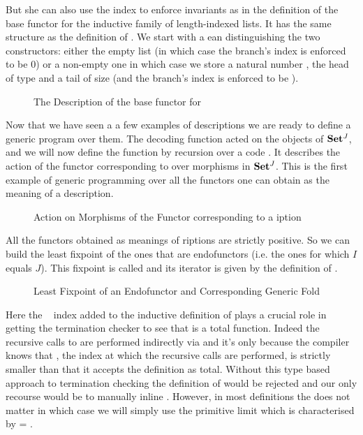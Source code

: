 But she can also use the index to enforce invariants as in the definition
of the base functor for the    inductive family of
length-indexed lists. It has the same structure as the definition of .
We start with a ean distinguishing the two constructors: either
the empty list (in which case the branch's index is enforced to be $0$) or a
non-empty one in which case we store a natural number , the head of type
 and a tail of size  (and the branch's index is enforced to be
 ).

\begin{figure}[h]
\caption{The Description of the base functor for   }\label{figure:vecD}
\end{figure}

Now that we have seen a a few examples of descriptions we are ready to define
a generic program over them. The decoding function  acted on the objects
of $\mathbf{Set}{}^J$, and we will now define the function  by recursion over a
code . It describes the action of the functor corresponding to  over
morphisms in $\mathbf{Set}{}^J$. This is the first example of generic programming over all
the functors one can obtain as the meaning of a description.

\begin{figure}[h]
\caption{Action on Morphisms of the Functor corresponding to a iption}
\end{figure}

All the functors obtained as meanings of riptions are strictly
positive. So we can build the least fixpoint of the ones that are endofunctors
(i.e. the ones for which $I$ equals $J$). This fixpoint is called 
and its iterator is given by the definition of  .

\begin{figure}[h]
\caption{Least Fixpoint of an Endofunctor and Corresponding Generic Fold}
\end{figure}

Here the ~\cite{DBLP:journals/corr/abs-1012-4896} index added
to the inductive definition of  plays a crucial role in getting
the termination checker to see that  is a total function.
Indeed the recursive calls to  are performed indirectly via
 and it's only because the compiler knows that , the index
at which the recursive calls are performed, is strictly smaller than
  that it accepts the definition as total. Without this type
based approach to termination checking the definition of  would
be rejected and our only recourse would be to manually inline .
However, in most definitions the  does not matter in which case
we will simply use the primitive limit   which is
characterised by  =  .


